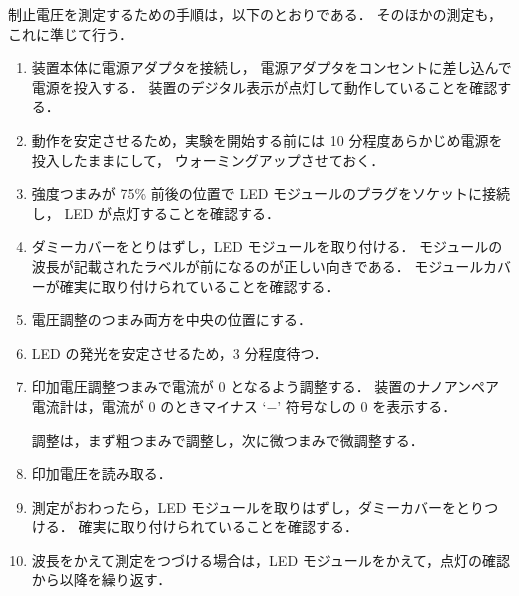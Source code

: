 \documentclass[11pt,sort]{jarticle}
\begin{document}
制止電圧を測定するための手順は，以下のとおりである．
そのほかの測定も，これに準じて行う．
\begin{enumerate}
\item
装置本体に電源アダプタを接続し，
電源アダプタをコンセントに差し込んで電源を投入する．
装置のデジタル表示が点灯して動作していることを確認する．
\item
動作を安定させるため，実験を開始する前には 10 分程度あらかじめ電源を投入したままにして，
ウォーミングアップさせておく．
\item
強度つまみが 75\% 前後の位置で LED モジュールのプラグをソケットに接続し， LED が点灯することを確認する．
\item
ダミーカバーをとりはずし，LED モジュールを取り付ける．
モジュールの波長が記載されたラベルが前になるのが正しい向きである．
モジュールカバーが確実に取り付けられていることを確認する．
\item
電圧調整のつまみ両方を中央の位置にする．
\item
LED の発光を安定させるため，3 分程度待つ．
\item
印加電圧調整つまみで電流が $0$ となるよう調整する．
装置のナノアンペア電流計は，電流が $0$ のときマイナス `$-$' 符号なしの $0$ を表示する．

調整は，まず粗つまみで調整し，次に微つまみで微調整する．
\item
印加電圧を読み取る．
\item
測定がおわったら，LED モジュールを取りはずし，ダミーカバーをとりつける．
確実に取り付けられていることを確認する．
\item
波長をかえて測定をつづける場合は，LED モジュールをかえて，点灯の確認から以降を繰り返す．
\end{enumerate}
\end{document}
